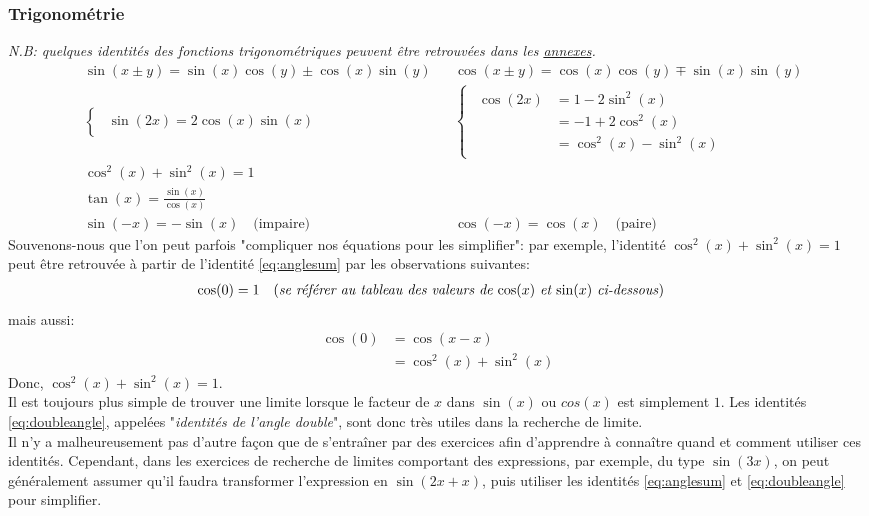 \documentclass{article}
\numberwithin{equation}{subsection}
\begin{document}
\subsubsection{Trigonométrie}
\emph{N.B: quelques identités des fonctions trigonométriques peuvent être retrouvées dans les \hyperref[sec:hypertrigo]{annexes}.}
\begin{align}
	\label{eq:anglesum}
	&\sin(x \pm y) 	= \sin(x) \cos(y) \pm \cos(x) \sin(y)	& &\cos(x \pm y) 	= \cos(x) \cos(y) \mp \sin(x)\sin(y) \\
	\label{eq:doubleangle}
	&\begin{cases}
		\begin{aligned}	
			\sin(2x) = 2\cos(x)\sin(x)
		\end{aligned} 
	\end{cases} & &\begin{cases}
		\begin{aligned}
			\cos(2x) 	&= 1 - 2\sin^2(x) \\
						&= -1 + 2\cos^2(x)  \\
						&= \cos^2(x) - \sin^2(x)
		\end{aligned}
	\end{cases} \\
	&\cos^2(x) + \sin^2(x) = 1 \\
	&\tan(x) = \frac{\sin(x)}{\cos(x)} \\
	&\sin(-x) = -\sin(x) \quad \text{(impaire)}		& &\cos(-x) = \cos(x) \quad \text{(paire)}
\end{align}
Souvenons-nous que l'on peut parfois "compliquer nos équations pour les simplifier": par exemple, l'identité \(\cos^2(x) + \sin^2(x) = 1\) peut être retrouvée à partir de l'identité \ref{eq:anglesum} par les observations suivantes: 
\vspace{-0.2cm}
\begin{align*}
	\cos(0) 	&= 1 \quad \text{(\emph{se référer au tableau des valeurs de \(\cos(x)\) et \(\sin(x)\) ci-dessous})}
\end{align*}
\vspace{-0.2cm}
mais aussi: 
\begin{align*}
	\cos(0)	&= \cos(x-x) \\
				&= \cos^2(x) + \sin^2(x) 
\end{align*}
Donc, \(\cos^2(x) + \sin^2(x) = 1\). \\
Il est toujours plus simple de trouver une limite lorsque le facteur de \(x\) dans \(\sin(x)\) ou \(cos(x)\) est simplement \(1\). Les identités \ref{eq:doubleangle}, appelées "\emph{identités de l'angle double}", sont donc très utiles dans la recherche de limite. \\
Il n'y a malheureusement pas d'autre façon que de s'entraîner par des exercices afin d'apprendre à connaître quand et comment utiliser ces identités. Cependant, dans les exercices de recherche de limites comportant des expressions, par exemple, du type \(\sin(3x)\), on peut généralement assumer qu'il faudra transformer l'expression en \(\sin(2x + x)\), puis utiliser les identités \ref{eq:anglesum} et \ref{eq:doubleangle} pour simplifier.
\end{document}
